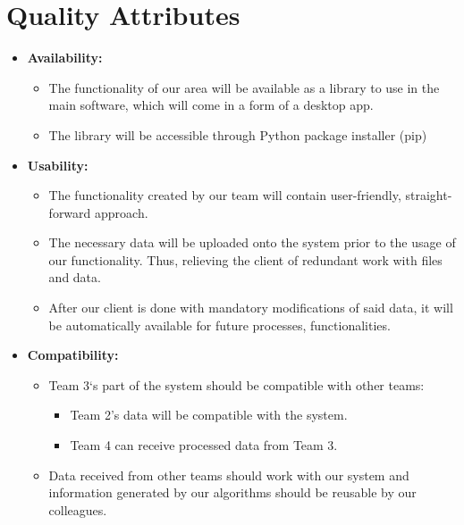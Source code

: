 \documentclass[a4paper,12pt,fleqn]{article}
\begin{document}
\section{Quality Attributes}
\begin{itemize}
    \item \textbf{Availability:}
    \begin{itemize}
        \item The functionality of our area will be available as a library to use in the main software, which will come in a form of a desktop app.
        
        \item The library will be accessible through Python package installer (pip)
    \end{itemize}
    
    \item \textbf{Usability:}
    \begin{itemize}
        \item The functionality created by our team will contain user-friendly, straight-forward approach. 
        
        \item The necessary data will be uploaded onto the system prior to the usage of our functionality. Thus, relieving the client of redundant work with files and data. 
        
        \item After our client is done with mandatory modifications of said data, it will be automatically available for future processes, functionalities. 
    \end{itemize}
    
    \item \textbf{Compatibility:}
    \begin{itemize}
        \item Team 3‘s part of the system should be compatible with other teams:
        \begin{itemize}
            \item Team 2’s data will be compatible with the system. 
            \item Team 4 can receive processed data from Team 3.
        \end{itemize}
        \item Data received from other teams should work with our system and information generated by our algorithms should be reusable by our colleagues. 
    \end{itemize}
    

\end{itemize}
\end{document}
